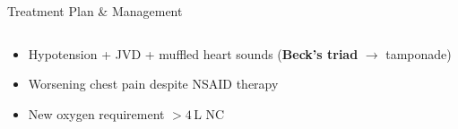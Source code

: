 \documentclass[10pt,aspectratio=169]{beamer}
\begin{document}
\begin{frame}{Treatment Plan \& Management}
\begin{columns}[T]
    \vspace{0.2cm}

    \begin{tcolorbox}[alertbox,title={\faBell\hspace{4pt}Red Flags -- Escalate Immediately}]
      \small
      \begin{itemize}
        \item Hypotension + JVD + muffled heart sounds (\textbf{Beck's triad} $\rightarrow$ tamponade)
        \item Worsening chest pain despite NSAID therapy
        \item New oxygen requirement $>4$\,L NC
      \end{itemize}
    \end{tcolorbox}
  \end{columns}
\end{frame}
\end{document}
